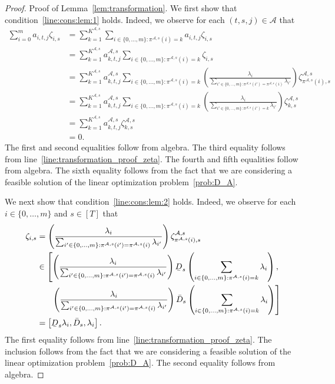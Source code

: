 \documentclass[nonblindrev,mnsc]{informs3} %
\newcommand{\ubar}[1]{\text{\b{$#1$}}}
\begin{document}
\begin{APPENDICES}
\begin{proof}{Proof of Lemma~\ref{lem:transformation}.}
We first show that condition~\eqref{line:cons:lem:1} holds. Indeed,  we observe for each $(t,s,j) \in \mathcal{A}$ that 
\begin{align*}
\sum_{i=0}^m a_{i,t,j} \zeta_{i,s} &= \sum_{k=1}^{K^{\mathcal{A},s}} \sum_{i \in \{0,\ldots,m\}: \pi^{\mathcal{A},s}(i) = k}  a_{i,t,j} \zeta_{i,s}\\
&=  \sum_{k=1}^{K^{\mathcal{A},s}}a^{\mathcal{A},s}_{k,t,j} \sum_{i \in \{0,\ldots,m\}: \pi^{\mathcal{A},s}(i) = k} \zeta_{i,s}\\
&=  \sum_{k=1}^{K^{\mathcal{A},s}}a^{\mathcal{A},s}_{k,t,j} \sum_{i \in \{0,\ldots,m\}: \pi^{\mathcal{A},s}(i) = k} \left( \frac{\lambda_i}{\sum_{i' \in \{0,\ldots,m\}: \pi^{\mathcal{A},s}(i') = \pi^{\mathcal{A},s}(i)} \lambda_{i'}} \right) \zeta^{\mathcal{A},s}_{\pi^{\mathcal{A},s}(i),s}\\
&=  \sum_{k=1}^{K^{\mathcal{A},s}}a^{\mathcal{A},s}_{k,t,j} \sum_{i \in \{0,\ldots,m\}: \pi^{\mathcal{A},s}(i) = k} \left( \frac{\lambda_i}{\sum_{i' \in \{0,\ldots,m\}: \pi^{\mathcal{A},s}(i') = k} \lambda_{i'}} \right) \zeta^{\mathcal{A},s}_{k,s}\\
&=  \sum_{k=1}^{K^{\mathcal{A},s}}a^{\mathcal{A},s}_{k,t,j} \zeta^{\mathcal{A},s}_{k,s}\\
&= 0. 
\end{align*}
The first and second equalities follow from algebra. The third equality follows from line~\eqref{line:transformation_proof_zeta}. The fourth and fifth equalities follow from algebra. The sixth equality follows from the fact that we are considering a feasible solution of the linear optimization problem~\eqref{prob:D_A}. 

We next show that condition~\eqref{line:cons:lem:2} holds. Indeed, we observe for each $i \in \{0,\ldots,m\}$ and $s \in [T]$ that
\begin{align*}
\zeta_{i,s} &= \left( \frac{\lambda_i}{\sum_{i' \in \{0,\ldots,m\}: \pi^{\mathcal{A},s}(i') = \pi^{\mathcal{A},s}(i)} \lambda_{i'}} \right) \zeta^{\mathcal{A},s}_{\pi^{\mathcal{A},s}(i),s} \\
&\in \left[ \left( \frac{\lambda_i}{\sum_{i' \in \{0,\ldots,m\}: \pi^{\mathcal{A},s}(i') = \pi^{\mathcal{A},s}(i)} \lambda_{i'}} \right) \ubar{D}_s \left( \sum_{i \in \{0,\ldots,m\}: \pi^{\mathcal{A},s}(i) = k} \lambda_{i} \right) , \right.  \\
&\phantom{\in \Big[}\;  \left.   \left( \frac{\lambda_i}{\sum_{i' \in \{0,\ldots,m\}: \pi^{\mathcal{A},s}(i') = \pi^{\mathcal{A},s}(i)} \lambda_{i'}} \right) \bar{D}_s \left( \sum_{i \in \{0,\ldots,m\}: \pi^{\mathcal{A},s}(i) = k} \lambda_{i} \right) \right] \\
&= \left[ \ubar{D}_s \lambda_i, \bar{D}_s,\lambda_i \right]. 
\end{align*}
The first equality follows from line~\eqref{line:transformation_proof_zeta}. The inclusion follows from the fact that  we are considering a feasible solution of the linear optimization problem~\eqref{prob:D_A}. The second equality follows from algebra. 


\end{proof}
\end{APPENDICES}
\end{document}
